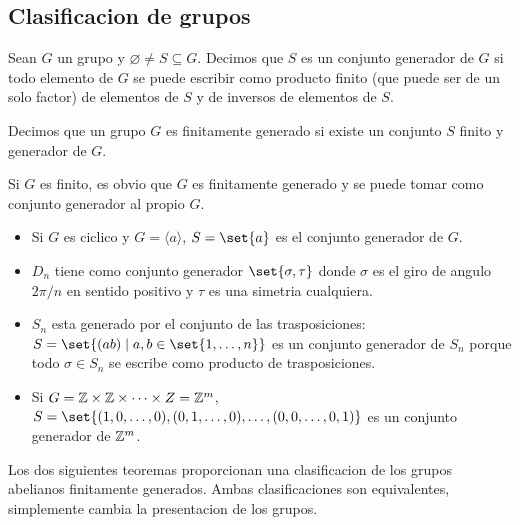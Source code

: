 \subsection{Clasificacion de grupos}
\begin{definition}
	Sean \(G \) un grupo y \(\varnothing \neq S \subseteq G \). Decimos que \(S \) es un conjunto generador de \(G \) si todo elemento de \(G \) se puede escribir como producto finito (que puede ser de un solo factor) de elementos de \(S \) y de inversos de elementos de \(S \).
\end{definition}
\begin{definition}
	Decimos que un grupo \(G \) es finitamente generado si existe un conjunto \(S \) finito y generador de \(G  \).
\end{definition}
\begin{remark}
	Si \(G \) es finito, es obvio que \(G \) es finitamente generado y se puede tomar como conjunto generador al propio \(G \). 
\end{remark}
\begin{remark}
	\begin{itemize}
		\item Si \(G \) es ciclico y \(G = \langle a \rangle \), \(S = \set{a }\) es el conjunto generador de \(G \).
		\item \(D_n \) tiene como conjunto generador \(\set{\sigma, \tau}\) donde \(\sigma\) es el giro de angulo \(2\pi / n \) en sentido positivo y \(\tau\) es una simetria cualquiera.
		\item \(S_n \) esta generado por el conjunto de las trasposiciones: \(S = \set{(ab) \mid a,b \in \set{1,\ldots,n }}\) es un conjunto generador de \(S_n \) porque todo \(\sigma \in S_n \) se escribe como producto de trasposiciones.
		\item Si \(G = \mathbb{Z} \times \mathbb{Z} \times \cdots \times Z = \mathbb{Z}^{m} \), \(S = \set{(1, 0, \ldots, 0), (0,1,\ldots,0), \ldots, (0,0,\ldots,0,1)} \) es un conjunto generador de \(\mathbb{Z}^{m } \).
	\end{itemize}
\end{remark}
Los dos siguientes teoremas proporcionan una clasificacion de los grupos abelianos finitamente generados. Ambas clasificaciones son equivalentes, simplemente cambia la presentacion de los grupos. 

